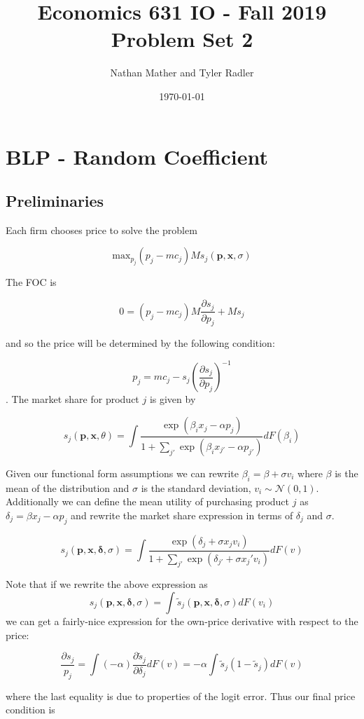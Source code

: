 \documentclass{article}
\title{Economics 631 IO - Fall 2019\\Problem Set 2}
\author{Nathan Mather and Tyler Radler}
\date{\today}
\newcommand{\1}{\mathbbm{1}}
\begin{document}
\maketitle

\section{BLP - Random Coefficient}

\subsection*{Preliminaries}
Each firm chooses price to solve the problem

$$\text{max}_{p_j} (p_j - mc_j)Ms_j(\bm p, \bm x, \sigma)$$

The FOC is

$$0 = (p_j - mc_j)M\frac{\partial s_j}{\partial p_j} + M s_j$$

and so the price will be determined by the following condition:

$$p_j = mc_j-s_j(\frac{\partial s_j}{\partial p_j})^{-1}$$.
 The market share for product $j$ is given by 

$$ s_{j}(\bm p, \bm x, \theta) = \int \frac{\exp (\beta_i x_{j} - \alpha p_{j})} {1 + \sum_{j'} \exp(\beta_i x_{j'} - \alpha p_{j'})} dF(\beta_{i})$$

Given our functional form assumptions we can rewrite $\beta_{i} = \beta + \sigma v_{i}$ where $\beta$ is the mean of the distribution and $\sigma$ is the standard deviation, $v_i \sim \mathcal{N}(0,1)$. Additionally we can define the mean utility of purchasing product $j$ as $\delta_j = \beta x_{j} - \alpha p_j$ and rewrite the market share expression in terms of $\delta_j$ and $\sigma$.

$$ s_{j}(\bm p, \bm x, \bm \delta, \sigma) = 
\int \frac{\exp (\delta_j  + \sigma x_j v_{i})}
{1 + \sum_{j'} \exp(\delta_{j'} + \sigma x_j' v_{i})}
dF(v)
$$
	
Note that if we rewrite the above expression as $$s_{j}(\bm p, \bm x, \bm \delta, \sigma) = 
\int \tilde{s}_j (\bm p, \bm x, \bm \delta, \sigma)  dF(v_{i}) $$ we can get a fairly-nice expression for the own-price derivative with respect to the price:

$$\frac{\partial s_j}{p_j} = \int (-\alpha)\frac{\partial \tilde{s}_j}{\partial \delta_j}dF(v) = -\alpha \int \tilde{s}_j(1-\tilde{s}_j)dF(v)$$

where the last equality is due to properties of the logit error. Thus our final price condition is 
\end{document}
